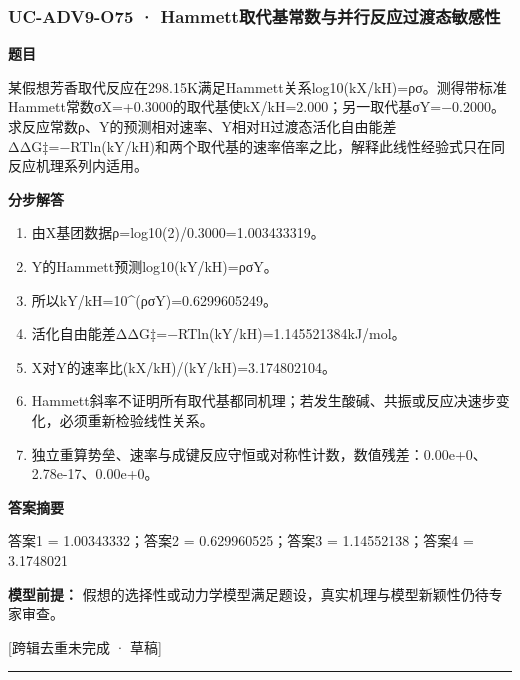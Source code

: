 \documentclass[UTF8,11pt,a4paper]{ctexart}
\begin{document}
\subsubsection*{UC-ADV9-O75 · Hammett取代基常数与并行反应过渡态敏感性}
\noindent\textbf{题目}\par
某假想芳香取代反应在298.15K满足Hammett关系log10(kX/kH)=ρσ。测得带标准Hammett常数σX=+0.3000的取代基使kX/kH=2.000；另一取代基σY=−0.2000。求反应常数ρ、Y的预测相对速率、Y相对H过渡态活化自由能差ΔΔG‡=−RTln(kY/kH)和两个取代基的速率倍率之比，解释此线性经验式只在同反应机理系列内适用。\par
\medskip\noindent\textbf{分步解答}
\begin{enumerate}
\item 由X基团数据ρ=log10(2)/0.3000=1.003433319。
\item Y的Hammett预测log10(kY/kH)=ρσY。
\item 所以kY/kH=10\textasciicircum{}(ρσY)=0.6299605249。
\item 活化自由能差ΔΔG‡=−RTln(kY/kH)=1.145521384kJ/mol。
\item X对Y的速率比(kX/kH)/(kY/kH)=3.174802104。
\item Hammett斜率不证明所有取代基都同机理；若发生酸碱、共振或反应决速步变化，必须重新检验线性关系。
\item 独立重算势垒、速率与成键反应守恒或对称性计数，数值残差：0.00e+0、2.78e-17、0.00e+0。
\end{enumerate}
\noindent\textbf{答案摘要}\par
答案1 = 1.00343332；答案2 = 0.629960525；答案3 = 1.14552138；答案4 = 3.1748021\par
\noindent\textbf{模型前提：}
假想的选择性或动力学模型满足题设，真实机理与模型新颖性仍待专家审查。\par
\noindent\textcolor{red!65!black}{[跨辑去重未完成 · 草稿]} \par
\medskip\hrule\medskip
{}
\end{document}
